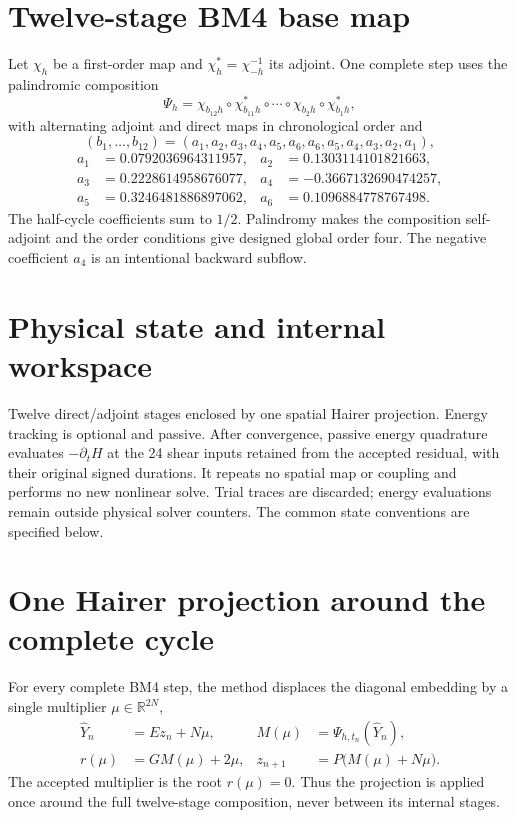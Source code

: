 \documentclass[11pt,a4paper]{article}
\newcommand{\R}{\mathbb{R}}
\begin{document}
\section{Twelve-stage BM4 base map}

Let $\chi_h$ be a first-order map and $\chi_h^*=\chi_{-h}^{-1}$ its
adjoint.  One complete step uses the palindromic composition
\[
\Psi_h=\chi_{b_{12}h}\circ\chi^*_{b_{11}h}\circ\cdots
\circ\chi_{b_2h}\circ\chi^*_{b_1h},
\]
with alternating adjoint and direct maps in chronological order and
\[
(b_1,\ldots,b_{12})=(a_1,a_2,a_3,a_4,a_5,a_6,a_6,a_5,a_4,a_3,a_2,a_1),
\]
\begin{align*}
a_1&=0.0792036964311957,&a_2&=0.1303114101821663,\\
a_3&=0.2228614958676077,&a_4&=-0.3667132690474257,\\
a_5&=0.3246481886897062,&a_6&=0.1096884778767498.
\end{align*}
The half-cycle coefficients sum to $1/2$.  Palindromy makes the composition
self-adjoint and the order conditions give designed global order four.  The
negative coefficient $a_4$ is an intentional backward subflow.

\section{Physical state and internal workspace}
Twelve direct/adjoint stages enclosed by one spatial Hairer projection. Energy tracking is optional and passive.
After convergence, passive energy quadrature evaluates $-\partial_t H$ at the
24 shear inputs retained from the accepted residual, with their original signed
durations. It repeats no spatial map or coupling and performs no new nonlinear
solve. Trial traces are discarded; energy evaluations remain outside physical
solver counters.
The common state conventions are specified below.

\section{One Hairer projection around the complete cycle}

For every complete BM4 step, the method displaces the diagonal embedding by a
single multiplier $\mu\in\R^{2N}$,
\begin{align}
\widehat Y_n&=Ez_n+N\mu,
&M(\mu)&=\Psi_{h,t_n}(\widehat Y_n),\\
r(\mu)&=GM(\mu)+2\mu,
&z_{n+1}&=P\bigl(M(\mu)+N\mu\bigr).
\end{align}
The accepted multiplier is the root $r(\mu)=0$.  Thus the projection is
applied once around the full twelve-stage composition, never between its
internal stages.
\end{document}
